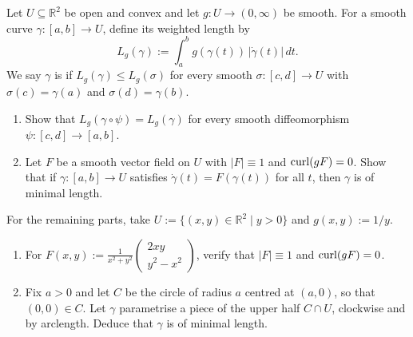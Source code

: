 \begin{exercise}
\label{ex:poincare_geodesics_stokes}
Let $U \subseteq \mathbb{R}^2$ be open and convex and let $g : U \to (0,\infty)$ be smooth. For a
smooth curve $\gamma : [a,b] \to U$, define its weighted length by
\[L_g(\gamma) := \int_a^b g(\gamma(t))\,\lvert\dot\gamma(t)\rvert \, dt.\]
We say $\gamma$ is  if $L_g(\gamma) \le L_g(\sigma)$ for every smooth
$\sigma : [c,d] \to U$ with $\sigma(c) = \gamma(a)$ and $\sigma(d) = \gamma(b)$.
\begin{enumerate}[label=\textbf{(\alph*)}]
  \item Show that $L_g(\gamma \circ \psi) = L_g(\gamma)$ for every smooth diffeomorphism
    $\psi : [c,d] \to [a,b]$.
  \item Let $F$ be a smooth vector field on $U$ with $\lvert F\rvert \equiv 1$ and $\operatorname{curl}(g F) = 0$.
    Show that if $\gamma : [a,b] \to U$ satisfies $\dot\gamma(t) = F(\gamma(t))$ for all $t$, then
    $\gamma$ is of minimal length.
\end{enumerate}
For the remaining parts, take $U := \{(x,y) \in \mathbb{R}^2 \mid y > 0\}$ and $g(x,y) := 1/y$.
\begin{enumerate}[label=\textbf{(\alph*)}, resume]
  \item For $F(x,y) := \frac{1}{x^2+y^2} \left(\begin{smallmatrix} 2xy \\ y^2-x^2 \end{smallmatrix}\right)$, verify that $\lvert F\rvert \equiv 1$ and $\operatorname{curl}(gF) = 0$.
  \item Fix $a > 0$ and let $C$ be the circle of radius $a$ centred at $(a,0)$, so that
    $(0,0) \in C$. Let $\gamma$ parametrise a piece of the upper half $C \cap U$, clockwise and by
    arclength. Deduce that $\gamma$ is of minimal length.
\end{enumerate}
\end{exercise}

